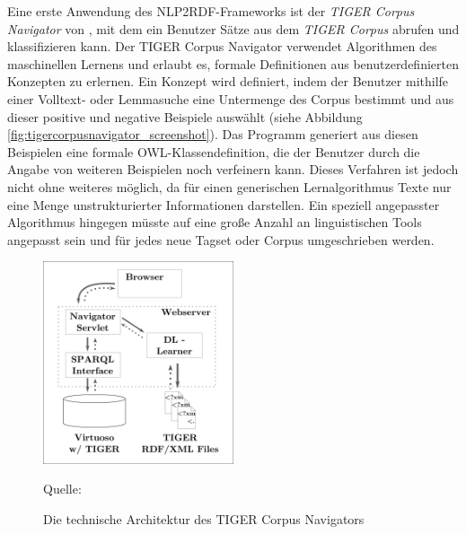 Eine erste Anwendung des NLP2RDF-Frameworks ist der \emph{TIGER Corpus Navigator} von \citet*{tiger_corpus_navigator},
mit dem ein Benutzer Sätze aus dem \emph{TIGER Corpus} \citep{tiger1,tiger2} abrufen und klassifizieren kann.
Der TIGER Corpus Navigator verwendet Algorithmen des maschinellen Lernens und erlaubt es, formale Definitionen aus benutzerdefinierten Konzepten zu erlernen.
Ein Konzept wird definiert, indem der Benutzer mithilfe einer Volltext- oder Lemmasuche eine Untermenge des Corpus bestimmt und aus dieser positive und negative Beispiele auswählt (siehe Abbildung \ref{fig:tigercorpusnavigator_screenshot}).
Das Programm generiert aus diesen Beispielen eine formale OWL-Klassendefinition, die der Benutzer durch die Angabe von weiteren Beispielen noch verfeinern kann.
Dieses Verfahren ist jedoch nicht ohne weiteres möglich, da für einen generischen Lernalgorithmus Texte nur eine Menge unstrukturierter Informationen darstellen.
Ein speziell angepasster Algorithmus hingegen müsste auf eine große Anzahl an linguistischen Tools angepasst sein und für jedes neue Tagset oder Corpus umgeschrieben werden.

\begin{figure}[htb]
\begin{center}
\begin{threeparttable}
\includegraphics[width=0.5\textwidth]{img/tigercorpusnavigator_architecture.png}
\begin{tablenotes}\footnotesize
 \item [] Quelle: \citet{tiger_corpus_navigator}
\end{tablenotes}
\end{threeparttable}
\caption{Die technische Architektur des TIGER Corpus Navigators}
\label{fig:tigercorpusnavigator_architecture}
\end{center}
\end{figure}

